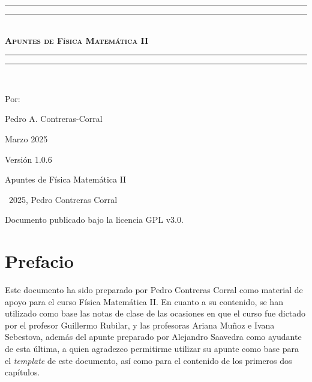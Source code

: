 \documentclass[letterpaper,12pt, twoside]{book}
\newlength{\drop}
\theoremstyle{definition}
\begin{document}
\newpage

\thispagestyle{empty}


\newpage

\begin{titlepage}
 \textheight
    \centering
    \vspace*{\baselineskip}
    \rule{\textwidth}{1.6pt}\vspace*{-\baselineskip}\vspace*{2pt}
    \rule{\textwidth}{0.4pt}\\[\baselineskip]
    {\scshape\bfseries\Huge{}\selectfont Apuntes de Física Matemática II} \\[0.2\baselineskip]
    \rule{\textwidth}{0.4pt}\vspace*{-\baselineskip}\vspace{3.2pt}
    \rule{\textwidth}{1.6pt}\\[\baselineskip]
    {\Large Por: \par}
{\large Pedro A. Contreras-Corral \par}
{\large Marzo 2025 \par}
\vfill
{\large Versión 1.0.6 \par}
\end{titlepage}

\mbox{} 
\vfill
Apuntes de Física Matemática II 

\textcopyright\ 2025, Pedro Contreras Corral %



Documento publicado bajo la licencia GPL v3.0.


\vspace{1cm} 

\restoregeometry

\chapter*{Prefacio}

Este documento ha sido preparado por Pedro Contreras Corral como material de apoyo para el curso Física Matemática II. En cuanto a su contenido, se han utilizado como base las notas de clase de las ocasiones en que el curso fue dictado por el profesor Guillermo Rubilar, y las profesoras Ariana Muñoz e Ivana Sebestova, además del apunte preparado por Alejandro Saavedra como ayudante de esta última, a quien agradezco permitirme utilizar su apunte como base para el \emph{template} de este documento, así como para el contenido de los primeros dos capítulos.
\end{document}
